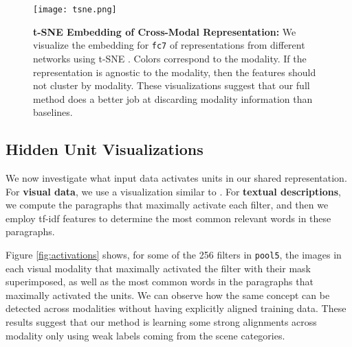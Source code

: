 \documentclass[10pt,journal,compsoc]{IEEEtran}
\begin{document}
     
         
    \begin{figure*}[t!]
        \centering
        \texttt{[image: tsne.png]}
        
        \caption{\textbf{t-SNE Embedding of Cross-Modal Representation:} We visualize the embedding for \texttt{fc7} of representations from different networks using t-SNE \cite{maaten2008visualizing}. Colors correspond to the modality. If the representation is agnostic to the modality, then the features should not cluster by modality. These visualizations suggest that our full method does a better job at discarding modality information than baselines.}
        \label{fig:tsne}
    \end{figure*}

     
	\subsection{Hidden Unit Visualizations}
    
	
	We now investigate what input data activates units in our shared representation. For \textbf{visual data}, we use a visualization similar to \cite{zhou2014object}. For \textbf{textual descriptions}, we compute the paragraphs that maximally activate each filter, and then we employ tf-idf features to determine the most common relevant words in these paragraphs.
	
	Figure \ref{fig:activations} shows, for some of the 256 filters in \texttt{pool5}, the images in each visual modality that maximally activated the filter with their mask superimposed, as well as the most common words in the paragraphs that maximally activated the units.  We can observe how the same concept can be detected across modalities without having explicitly aligned training data. These results suggest that our method is learning some strong alignments across modality only using weak labels coming from the scene categories. 
	
\end{document}
